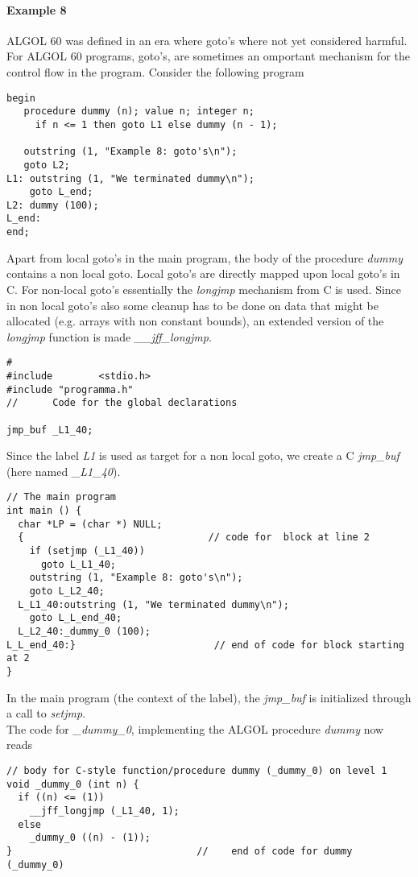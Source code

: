 \documentclass[11pt]{article}
\begin{document}
\paragraph{Example 8}
ALGOL 60 was defined in an era where goto's where not yet considered harmful.
For ALGOL 60 programs, goto's, are sometimes an omportant mechanism
for the control flow in the program.
Consider the following program
{\footnotesize
\begin{verbatim}
begin
   procedure dummy (n); value n; integer n;
     if n <= 1 then goto L1 else dummy (n - 1);

   outstring (1, "Example 8: goto's\n");
   goto L2;
L1: outstring (1, "We terminated dummy\n");
    goto L_end;
L2: dummy (100);
L_end:
end;
\end{verbatim}
}
Apart from local goto's in the main program,
the body of the procedure {\em dummy}
contains a non local goto.
Local goto's are directly mapped upon local goto's in C.
For non-local goto's essentially the {\em longjmp} mechanism from C is
used. Since in non local goto's also some cleanup has to be done
on data that might be allocated (e.g. arrays with non constant bounds),
an extended version of the {\em longjmp} function is made {\em \_\_jff\_longjmp}.
{\footnotesize
\begin{verbatim}
#
#include        <stdio.h>
#include "programma.h"
//      Code for the global declarations

jmp_buf _L1_40;
\end{verbatim}
}
Since the label {\em L1} is used as target for a non local goto, we create a 
C {\em jmp\_buf} (here named {\em \_L1\_40}).
{\footnotesize
\begin{verbatim}
// The main program
int main () {
  char *LP = (char *) NULL;
  {                                // code for  block at line 2 
    if (setjmp (_L1_40))
      goto L_L1_40;
    outstring (1, "Example 8: goto's\n");
    goto L_L2_40;
  L_L1_40:outstring (1, "We terminated dummy\n");
    goto L_L_end_40;
  L_L2_40:_dummy_0 (100);
L_L_end_40:}                        // end of code for block starting at 2
}
\end{verbatim}
}
In the main program (the context of the label),
the {\em jmp\_buf} is initialized through a call to {\em setjmp}.
\ \\
The code for {\em \_dummy\_0}, implementing the ALGOL procedure {\em dummy}
now reads
{\footnotesize
\begin{verbatim}
// body for C-style function/procedure dummy (_dummy_0) on level 1
void _dummy_0 (int n) {
  if ((n) <= (1))
    __jff_longjmp (_L1_40, 1);
  else
    _dummy_0 ((n) - (1));
}                                //    end of code for dummy (_dummy_0)
\end{verbatim}
}
\end{document}
